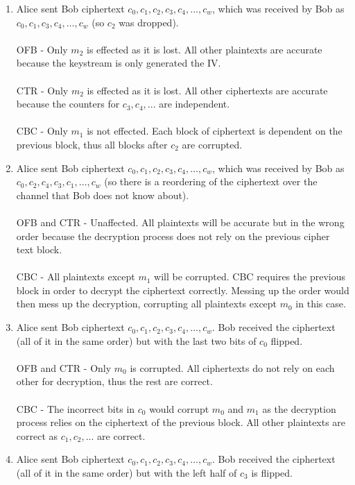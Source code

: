\documentclass[12pt]{article}
\begin{document}
\begin{enumerate}
\begin{enumerate}
    \item Alice sent Bob ciphertext $c_0, c_1, c_2, c_3, c_4, \dots, c_w$, which was received by Bob as $c_0, c_1, c_3, c_4, \dots, c_w$ (so $c_2$ was dropped). 
\\\\OFB - Only $m_2$ is effected as it is lost. All other plaintexts are accurate because the keystream is only generated the IV.
\\\\CTR - Only $m_2$ is effected as it is lost. All other ciphertexts are accurate because the counters for $c_3, c_4, ...$ are independent.
\\\\CBC - Only $m_1$ is not effected. Each block of ciphertext is dependent on the previous block, thus all blocks after $c_2$ are corrupted. 
\newline    
    \item Alice sent Bob ciphertext $c_0, c_1, c_2, c_3, c_4, \dots, c_w$, which was received by Bob as $c_0, c_2, c_4, c_3, c_1, \dots, c_w$ (so there is a reordering of the ciphertext over the channel that Bob does not know about).
\\\\OFB and CTR - Unaffected. All plaintexts will be accurate but in the wrong order because the decryption process does not rely on the previous cipher text block.
\\\\CBC - All plaintexts except $m_1$ will be corrupted. CBC requires the previous block in order to decrypt the ciphertext correctly. Messing up the order would then mess up the decryption, corrupting all plaintexts except $m_0$ in this case.
\newline
    \item Alice sent Bob ciphertext $c_0, c_1, c_2, c_3, c_4, \dots, c_w$. Bob received the ciphertext (all of it in the same order) but with the last two bits of $c_0$ flipped.
\\\\OFB and CTR - Only $m_0$ is corrupted. All ciphertexts do not rely on each other for decryption, thus the rest are correct.
\\\\CBC - The incorrect bits in $c_0$ would corrupt $m_0$ and $m_1$ as the decryption process relies on the ciphertext of the previous block. All other plaintexts are correct as $c_1, c_2, ...$ are correct. 
    \item Alice sent Bob ciphertext $c_0, c_1, c_2, c_3, c_4, \dots, c_w$. Bob received the ciphertext (all of it in the same order) but with the left half of $c_3$ is flipped.

\end{enumerate}
\end{enumerate}
\end{document}
